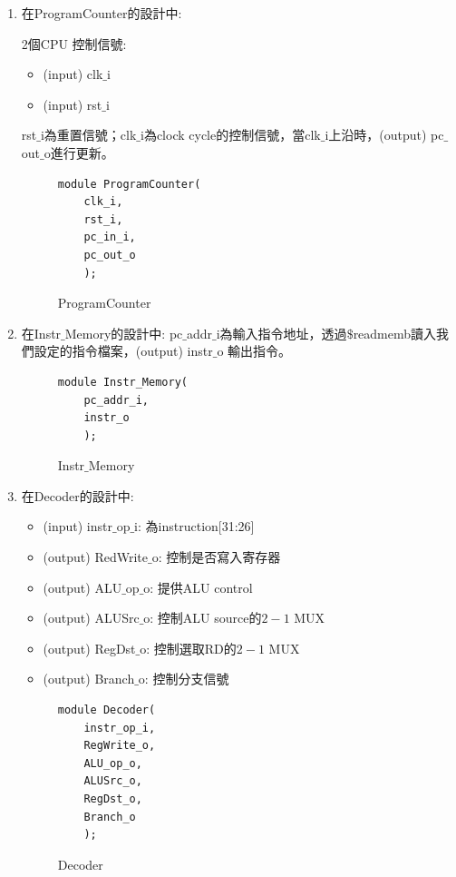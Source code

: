 \documentclass[12pt,a4paper]{article}
\theoremstyle{definition}
\begin{document}
\begin{enumerate}
\item
在ProgramCounter的設計中:

2個CPU 控制信號:
\begin{itemize}
\item (input) clk$\_$i
\item (input) rst$\_$i
\end{itemize}
rst$\_$i為重置信號；clk$\_$i為clock cycle的控制信號，當clk$\_$i上沿時，(output) pc$\_$out$\_$o進行更新。

\begin{figure}[H]
\centering
\begin{lstlisting}[caption={}]
module ProgramCounter(
    clk_i,
	rst_i,
	pc_in_i,
	pc_out_o
	);
\end{lstlisting}
\caption{ProgramCounter}
\label{fig:alu_top_}
\end{figure}

\item
在Instr$\_$Memory的設計中:
pc$\_$addr$\_$i為輸入指令地址，透過$\$$readmemb讀入我們設定的指令檔案，(output) instr$\_$o 輸出指令。

\begin{figure}[H]
\centering
\begin{lstlisting}[caption={}]
module Instr_Memory(
    pc_addr_i,
	instr_o
	);
\end{lstlisting}
\caption{Instr$\_$Memory}
\label{fig:alu_top_}
\end{figure}

\item
在Decoder的設計中:
\begin{itemize}
\item (input) instr$\_$op$\_$i: 為instruction[31:26]
\item (output) RedWrite$\_$o: 控制是否寫入寄存器
\item (output) ALU$\_$op$\_$o: 提供ALU control
\item (output) ALUSrc$\_$o: 控制ALU source的$2-1$ MUX
\item (output) RegDst$\_$o: 控制選取RD的$2-1$ MUX
\item (output) Branch$\_$o: 控制分支信號
\end{itemize}

\begin{figure}[H]
\centering
\begin{lstlisting}[caption={}]
module Decoder(
    instr_op_i,
	RegWrite_o,
	ALU_op_o,
	ALUSrc_o,
	RegDst_o,
	Branch_o
	);
\end{lstlisting}
\caption{Decoder}
\label{fig:alu_top_}
\end{figure}


\end{enumerate}
\end{document}
